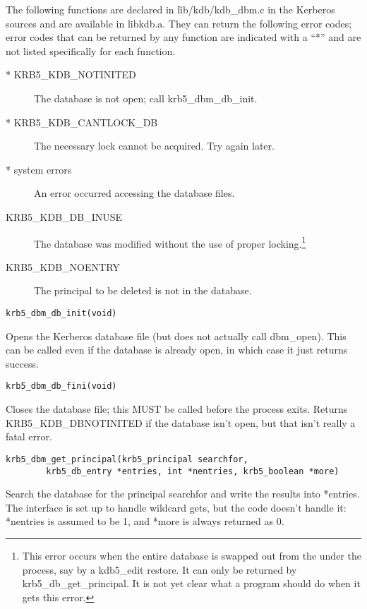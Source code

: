The following functions are declared in \v{lib/kdb/kdb_dbm.c} in the
Kerberos sources and are available in libkdb.a.  They can return the
following error codes; error codes that can be returned by any
function are indicated with a ``*'' and are not listed specifically
for each function.

\begin{description}
\item[* KRB5_KDB_NOTINITED] The database is not open; call
krb5_dbm_db_init.
\item[* KRB5_KDB_CANTLOCK_DB] The necessary lock cannot be acquired.  Try
again later.
\item[* system errors] An error occurred accessing the database files.
\item[KRB5_KDB_DB_INUSE] The database was modified without the use
of proper locking.\footnote{This error occurs when the entire database
is swapped out from the under the process, say by a kdb5_edit restore.
It can only be returned by krb5_db_get_principal.  It is not yet clear
what a program should do when it gets this error.}
\item[KRB5_KDB_NOENTRY] The principal to be deleted is not
in the database.
\end{description}

\begin{verbatim}
krb5_dbm_db_init(void)
\end{verbatim}

Opens the Kerberos database file (but does not actually call
dbm_open).  This can be called even if the database is already open,
in which case it just returns success.

\begin{verbatim}
krb5_dbm_db_fini(void)
\end{verbatim}

Closes the database file; this MUST be called before the process
exits.  Returns KRB5_KDB_DBNOTINITED if the database isn't open, but
that isn't really a fatal error.

\begin{verbatim}
krb5_dbm_get_principal(krb5_principal searchfor, 
        krb5_db_entry *entries, int *nentries, krb5_boolean *more)
\end{verbatim}

Search the database for the principal searchfor and write the results
into *entries.  The interface is set up to handle wildcard gets, but
the code doesn't handle it: *nentries is assumed to be 1, and *more is
always returned as 0.

